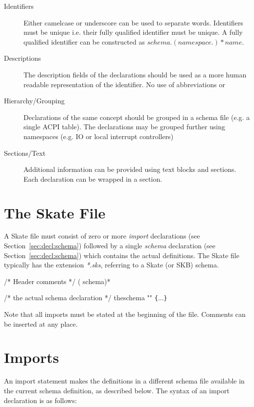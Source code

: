 \documentclass[a4paper,11pt,twoside]{report}
\begin{document}
{{\begin{description}
    \item[Identifiers] Either camelcase or underscore can be used to separate 
    words. Identifiers must be unique i.e. their fully qualified identifier must
    be unique. A fully qualified identifier can be constructed as 
    $schema.(namespace.)*name.$
    \item[Descriptions] The description fields of the declarations should be 
    used as a more human readable representation of the identifier. No use of
    abbreviations or  
    \item[Hierarchy/Grouping] Declarations of the same concept should be grouped
    in a schema file (e.g. a single ACPI table). The declarations may be 
    grouped further using namespaces (e.g. IO or local interrupt controllers)
    \item[Sections/Text] Additional information can be provided using text 
    blocks and sections. Each declaration can be wrapped in a section. 
\end{description}


\section{The Skate File}
A Skate file must consist of zero or more \emph{import} declarations (see
Section~\ref{sec:decl:schema}) followed by a single \emph{schema} declaration 
(see Section~\ref{sec:decl:schema}) which contains the actual definitions. The 
Skate file typically has the extension \emph{*.sks}, referring to a Skate (or 
SKB) schema.

\begin{syntax}
/* Header comments */
( schema)*

/* the actual schema declaration */
 theschema "" \verb+{+...\verb+}+
\end{syntax}

Note that all imports must be stated at the beginning of the file. Comments can
be inserted at any place.


\section{Imports}\label{sec:decl:import}
An import statement makes the definitions in a different schema file
available in the current schema definition, as described below.  The
syntax of an import declaration is as follows:

}}
\end{document}
